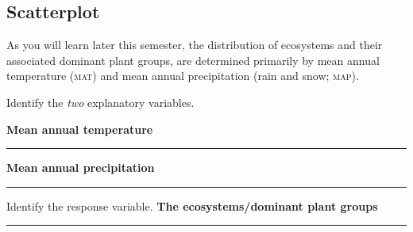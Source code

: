 \documentclass[12pt, hidelinks]{exam}
\newcommand*\AnswerBox[2]{%
	\parbox[t][#1]{0.92\textwidth}{%
		\begin{solution}#2\end{solution}
		\vskip\stretch{1}}
}
\begin{document}
\begin{questions}
%	
%	
%	
%	
%
%
%
%
%
%
%
%
\subsection*{Scatterplot}

As you will learn later this semester, the distribution of ecosystems and their associated dominant plant groups, are determined primarily by mean annual temperature (\textsc{mat}) and mean annual precipitation (rain and snow; \textsc{map}).

\question
Identify the \emph{two} explanatory variables.\smallskip 

	\quad \ifprintanswers \textbf{Mean annual temperature} \else \rule{1.5in}{0.4pt} \fi
	\qquad \ifprintanswers \textbf{Mean annual precipitation} \else \rule{1.5in}{0.4pt} \fi


	\medskip
	
\question
Identify the response variable. \ifprintanswers \textbf{The ecosystems/dominant plant groups} \else \rule{1.5in}{0.4pt} \fi


\end{questions}
\end{document}
